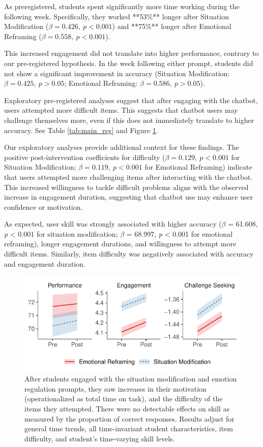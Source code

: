 \documentclass[11pt]{report}
\begin{document}
\begin{mainf}
As preregistered, students spent significantly more time working during the following week. 
Specifically, they worked **53\%** longer after Situation Modification (\(\beta=0.426,\ p<0.001\)) and **75\%** longer after Emotional Reframing (\(\beta=0.558,\ p<0.001\)).

This increased engagement did not translate into higher performance, contrary to our pre-registered hypothesis. 
In the week following either prompt, students did not show a significant improvement in accuracy (Situation Modification: \(\beta=0.425,\ p>0.05\); Emotional Reframing: \(\beta=0.586,\ p>0.05\)).

Exploratory pre-registered analyses suggest that after engaging with the chatbot, users attempted more difficult items. 
This suggests that chatbot users may challenge themselves more, even if this does not immediately translate to higher accuracy. See Table \ref{tab:main_reg} and Figure \ref{fig:main}.

Our exploratory analyses provide additional context for these findings. 
The positive post-intervention coefficients for difficulty (\(\beta=0.129,\ p<0.001\) for Situation Modification; \(\beta=0.119,\ p<0.001\) for Emotional Reframing) indicate that users attempted more challenging items after interacting with the chatbot. 
This increased willingness to tackle difficult problems aligns with the observed increase in engagement duration, suggesting that chatbot use may enhance user confidence or motivation.

As expected, user skill was strongly associated with higher accuracy ($\beta$ = 61.608, \textit{p} < 0.001 for situation modification; $\beta$ = 68.997, \textit{p} < 0.001 for emotional reframing), longer engagement durations, and willingness to attempt more difficult items. 
Similarly, item difficulty was negatively associated with accuracy and engagement duration.

\begin{figure}
    \centering
    \includegraphics[width=\linewidth]{main.pdf}
    \caption{After students engaged with the situation modification and emotion regulation prompts, they saw increases in their motivation (operationalized as total time on task), and the difficulty of the items they attempted. 
    There were no detectable effects on skill as measured by the proportion of correct responses. 
    Results adjust for general time trends, all time-invariant student characteristics, item difficulty, and student's time-varying skill levels.}
    \label{fig:main}
\end{figure}


\end{mainf}
\end{document}
